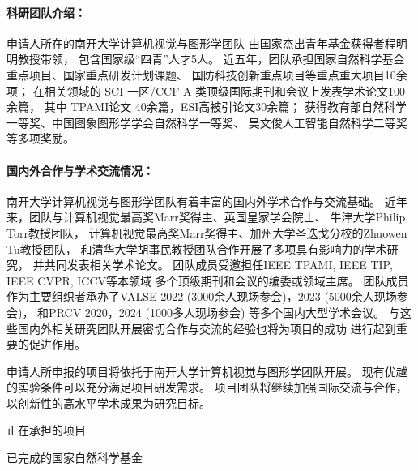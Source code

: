 \documentclass[12pt]{article}
\newcommand{\myPara}[1]{\paragraph{#1：}}
\begin{document}
\myPara{科研团队介绍}

申请人所在的南开大学计算机视觉与图形学团队
由国家杰出青年基金获得者程明明教授带领，
包含国家级“四青”人才5人。
%
近五年，团队承担国家自然科学基金重点项目、国家重点研发计划课题、
国防科技创新重点项目等重点重大项目10余项；
在相关领域的 SCI 一区/CCF A 类顶级国际期刊和会议上发表学术论文100余篇，
其中 TPAMI论文 40余篇，ESI高被引论文30余篇；
获得教育部自然科学一等奖、中国图象图形学学会自然科学一等奖、
吴文俊人工智能自然科学二等奖等多项奖励。


\myPara{国内外合作与学术交流情况}

南开大学计算机视觉与图形学团队有着丰富的国内外学术合作与交流基础。
近年来，团队与计算机视觉最高奖Marr奖得主、英国皇家学会院士、
牛津大学Philip Torr教授团队，
计算机视觉最高奖Marr奖得主、加州大学圣迭戈分校的Zhuowen Tu教授团队，
和清华大学胡事民教授团队合作开展了多项具有影响力的学术研究，
并共同发表相关学术论文。
团队成员受邀担任IEEE TPAMI, IEEE TIP, IEEE CVPR, ICCV等本领域
多个顶级期刊和会议的编委或领域主席。
团队成员作为主要组织者承办了VALSE 2022 (3000余人现场参会)，2023 (5000余人现场参会)，
和PRCV 2020，2024 (1000多人现场参会)
等多个国内大型学术会议。
%
与这些国内外相关研究团队开展密切合作与交流的经验也将为项目的成功
进行起到重要的促进作用。

申请人所申报的项目将依托于南开大学计算机视觉与图形学团队开展。
现有优越的实验条件可以充分满足项目研发需求。
项目团队将继续加强国际交流与合作，
以创新性的高水平学术成果为研究目标。



正在承担的项目


已完成的国家自然科学基金




\end{document}
